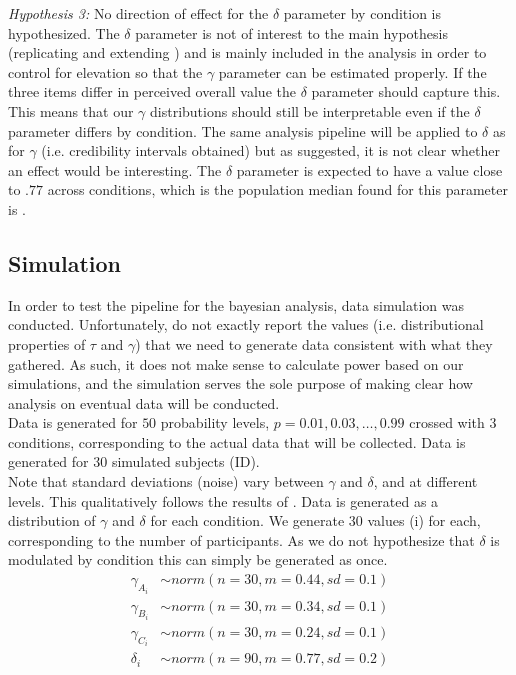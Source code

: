\documentclass[12pt]{article}
\begin{document}
\emph{Hypothesis 3:} No direction of effect
for the $\delta$ parameter by condition is
hypothesized. The  $\delta$ parameter is
not of interest to the main hypothesis
(replicating and extending \textcite{rottenstreich2001money})
and is mainly included in the analysis in
order to control for elevation so that the
$\gamma$ parameter can be estimated
properly. If the three items differ
in perceived overall value the $\delta$ parameter
should capture this. This means that our $\gamma$
distributions should still be interpretable
even if the $\delta$ parameter differs by
condition. The same analysis pipeline will be applied
to $\delta$ as for $\gamma$ (i.e. credibility
intervals obtained) but as suggested,
it is not clear whether an effect would
be interesting. The $\delta$ parameter is
expected to have a value close to $.77$
across conditions,
which is the population median found for
this parameter is \textcite{gonzalez1999shape}.

\subsection{Simulation}

In order to test the pipeline for the
bayesian analysis, data simulation was
conducted. Unfortunately, \textcite{gonzalez1999shape}
do not exactly report the values (i.e.
distributional properties of $\tau$ and
$\gamma$) that we need
to generate data consistent with what they
gathered. As such, it does not make sense
to calculate power based on our simulations,
and the simulation serves the sole purpose
of making clear how analysis on eventual data
will be conducted. \\

Data is generated for $50$ probability levels,
$p = 0.01, 0.03,  \ldots, 0.99$ crossed with $3$
conditions, corresponding to the actual data
that will be collected.
Data is generated for $30$ simulated subjects (ID). \\

Note that standard deviations (noise) vary
between $\gamma$ and $\delta$, and at
different levels. This qualitatively
follows the results of \textcite{gonzalez1999shape}.
Data is generated as a distribution of $\gamma$
and $\delta$ for each condition. We generate
$30$ values (i) for each, corresponding to the
number of participants. As we do not hypothesize
that $\delta$ is modulated by condition
this can simply be generated as once.
\begin{equation} \label{eq1}
\begin{split}
	\gamma_{A_{i}} &\sim norm(n = 30,
	m = 0.44, sd = 0.1) \\
	\gamma_{B_{i}} &\sim norm(n = 30,
	m = 0.34, sd = 0.1) \\
	\gamma_{C_{i}} &\sim norm(n = 30,
	m = 0.24, sd = 0.1) \\
	\delta_i &\sim norm(n = 90,
	m = 0.77, sd = 0.2)
\end{split}
\end{equation}
\end{document}
